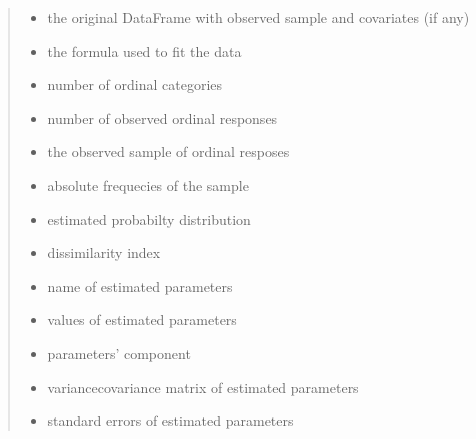 \documentclass[letterpaper,10pt,english]{sphinxmanual}
\begin{document}
\begin{fulllineitems}
\begin{quote}
\begin{description}
\begin{itemize}
\item {} 
\sphinxAtStartPar
{} \textendash{} the original DataFrame with observed sample and covariates (if any)

\item {} 
\sphinxAtStartPar
{} \textendash{} the formula used to fit the data

\item {} 
\sphinxAtStartPar
{} \textendash{} number of ordinal categories

\item {} 
\sphinxAtStartPar
{} \textendash{} number of observed ordinal responses

\item {} 
\sphinxAtStartPar
{} \textendash{} the observed sample of ordinal resposes

\item {} 
\sphinxAtStartPar
{} \textendash{} absolute frequecies of the sample

\item {} 
\sphinxAtStartPar
{} \textendash{} estimated probabilty distribution

\item {} 
\sphinxAtStartPar
{} \textendash{} dissimilarity index

\item {} 
\sphinxAtStartPar
{} \textendash{} name of estimated parameters

\item {} 
\sphinxAtStartPar
{} \textendash{} values of estimated parameters

\item {} 
\sphinxAtStartPar
{} \textendash{} parameters’ component

\item {} 
\sphinxAtStartPar
{} \textendash{} variance\sphinxhyphen{}covariance matrix of estimated parameters

\item {} 
\sphinxAtStartPar
{} \textendash{} standard errors of estimated parameters


\end{itemize}
\end{description}
\end{quote}
\end{fulllineitems}
\end{document}
